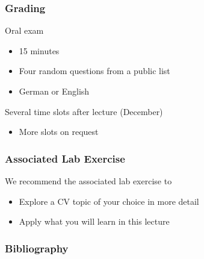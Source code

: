 \documentclass[xetex,professionalfont]{beamer}
\begin{document}

\begin{frame}
\frametitle{Grading}

Oral exam
\begin{itemize}
	\item 15 minutes
	\item Four random questions from a public list
	\item German or English
\end{itemize}

\bigskip
Several time slots after lecture (December)
\begin{itemize}
	\item More slots on request
\end{itemize}

\end{frame}


\begin{frame}
\frametitle{Associated Lab Exercise}

We recommend the associated lab exercise to
\begin{itemize}
	\item Explore a CV topic of your choice in more detail
	\item Apply what you will learn in this lecture
\end{itemize}

\end{frame}


\begin{frame}
\frametitle{Bibliography}

\printbibliography

\end{frame}
\end{document}
